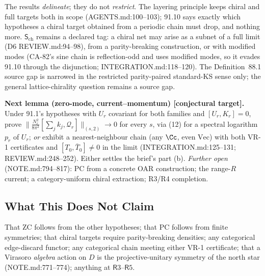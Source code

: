 The results \emph{delineate}; they do not \emph{restrict}.  The layering principle keeps chiral and full targets
both in scope (AGENTS.md:100--103); 91.10 says exactly which hypotheses a chiral target obtained from a periodic
chain must drop, and nothing more.  \(\mathsf S_{\mathrm{ch}}\) remains a declared tag: a chiral net may arise as a
subnet of a full limit (D6 REVIEW.md:94--98), from a parity-breaking construction, or with modified modes (CA-82's
sine chain is reflection-odd and uses modified modes, so it evades 91.10 through the disjunction;
INTEGRATION.md:118--120).  The Definition~88.1 source gap is narrowed in the restricted parity-paired standard-KS
sense only; the general lattice-chirality question remains a source gap.

\textbf{Next lemma (zero-mode, current--momentum) [conjectural target].}  Under 91.1's hypotheses with \(U_r\)
covariant for both families and \([U_r,K_r]=0\), prove \(\|\tfrac{N_r^2}{8\pi^2}[\sum_jk_j,\mathcal Q_r]\|_{(s,2)}\to0\) for every
\(s\), via (12) for a spectral logarithm \(p_r\) of \(U_r\); \emph{or} exhibit a nearest-neighbour chain (any \(\Cc\),
even \(\mathrm{Vec}\)) with both VR-1 certificates and \([T_0,\bar T_0]\neq0\) in the limit (INTEGRATION.md:125--131;
REVIEW.md:248--252).  Either settles the brief's part (b).
\emph{Further open} (NOTE.md:794--817): PC from a concrete OAR construction; the range-\(R\) current; a
category-uniform chiral extraction; R3/R4 completion.

\subsection{What This Does Not Claim}

That ZC follows from the other hypotheses; that PC follows from finite symmetries; that chiral targets require
parity-breaking densities; any categorical edge-discard functor; any categorical chain meeting either VR-1
certificate; that a Virasoro \emph{algebra} action on \(D\) is the projective-unitary symmetry of the north star
(NOTE.md:771--774); anything at \(\mathsf R3\)--\(\mathsf R5\).

